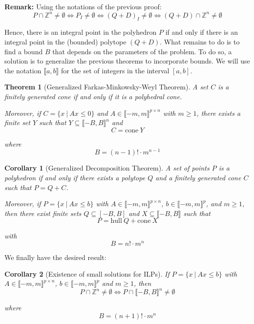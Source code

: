 \documentclass{article}
\newcommand{\cone}{\mathrm{cone}}
\newcommand{\hull}{\mathrm{hull}}
\newcommand{\ints}{\mathbb{Z}}
\newcommand{\ifff}{if and only if}
\newtheorem{theorem}{Theorem}
\newtheorem{corollary}{Corollary}
\begin{document}
\pagebreak

\textbf{Remark:}
Using the notations of the previous proof:
\begin{displaymath}
  P \cap \ints^n \neq \emptyset \Longleftrightarrow
  P_I \neq \emptyset            \Longleftrightarrow
  (Q + D)_I \neq \emptyset      \Longleftrightarrow
  (Q + D) \cap \ints^n \neq \emptyset
\end{displaymath}

Hence, there is an integral point in the polyhedron $P$ \ifff{} there is an
integral point in the (bounded) polytope $(Q + D)$.
What remains to do is to find a bound $B$ that depends on the
parameters of the problem. To do so, a solution is to generalize the previous
theorems to incorporate bounds. We will use the notation
$\llbracket a, b \rrbracket$ for the set of integers in the interval $[a, b]$.

\begin{theorem}[Generalized Farkas-Minkowsky-Weyl Theorem]
  A set $C$ is a finitely generated cone \ifff{} it is a polyhedral cone.

  Moreover, if $C = \{x~|~Ax \leqslant 0\}$ and
  $A \in \llbracket -m, m \rrbracket^{p \times n}$ with $m \geqslant 1$,
  there exists a finite set $Y$ such that
  $Y \subseteq \llbracket -B, B \rrbracket^n$
  and $$C = \cone~Y$$
  
  where
  $$B = (n - 1)! \cdot m^{n-1}$$
\end{theorem}

\begin{corollary}[Generalized Decomposition Theorem]
  A set of points $P$ is a polyhedron \ifff{} there exists a polytope $Q$ and a
  finitely generated cone $C$ such that $P = Q + C$.

  Moreover, if $P = \{x~|~Ax \leqslant b\}$ with
  $A \in \llbracket -m, m \rrbracket^{p \times n}$,
  $b \in \llbracket -m, m \rrbracket^p$, and $m \geqslant 1$,
  then there exist finite sets
  $Q \subseteq [-B, B]$ and $X \subseteq \llbracket -B, B \rrbracket$ such that
  $$P = \hull~Q + \cone~X$$
  
  with $$B = n! \cdot m^n$$
\end{corollary}

We finally have the desired result:

\begin{corollary}[Existence of small solutions for ILPs]
  \label{small-ilp}
  If $P = \{x~|~Ax \leqslant b\}$ with
  $A \in \llbracket -m, m \rrbracket^{p \times n}$,
  $b \in \llbracket -m, m \rrbracket^p$ and $m \geqslant 1$, then
  $$P \cap \ints^n \neq \emptyset \Longleftrightarrow
  P \cap \llbracket -B, B \rrbracket^n \neq \emptyset$$
  
  where
  $$B = (n + 1)! \cdot m^n$$
\end{corollary}
\end{document}
